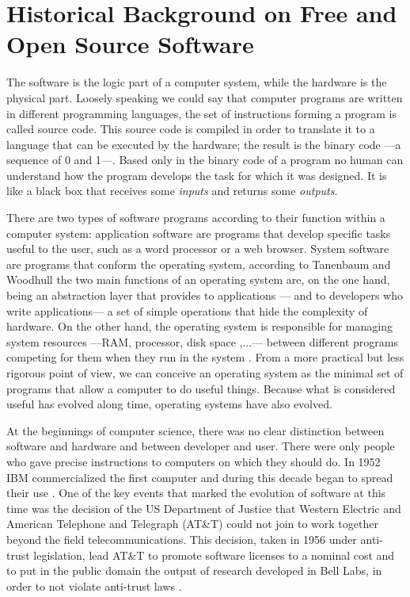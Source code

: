 \chapter{Historical Background on Free and Open Source Software}
\label{historical_outline}

The software is the logic part of a computer system, while the hardware is the physical part. Loosely speaking we could say that computer programs are written in different programming languages, the set of instructions forming a program is called source code. This source code is compiled in order to translate it to a language that can be executed by the hardware; the result is the binary code ---a sequence of 0 and 1---. Based only in the binary code of a program no human can understand how the program develops the task for which it was designed. It is like a black box that receives some \emph{inputs} and returns some \emph{outputs}.

There are two types of software programs according to their function within a computer system: application software are programs that develop specific tasks useful to the user, such as a word processor or a web browser. System software are programs that conform the operating system, according to Tanenbaum and Woodhull the two main functions of an operating system are, on the one hand, being an abstraction layer that provides to applications --- and to developers who write applications--- a set of simple operations that hide the complexity of hardware. On the other hand, the operating system is responsible for managing system resources ---RAM, processor, disk space ,...--- between different programs competing for them when they run in the system \citep[3-5]{tanenbaum:1996}. From a more practical but less rigorous point of view, we can conceive an operating system as the minimal set of programs that allow a computer to do useful things. Because what is considered useful has evolved along time, operating systems have also evolved.

At the beginnings of computer science, there was no clear distinction between software and hardware and between developer and user. There were only people who gave precise instructions to computers on which they should do. In 1952 IBM commercialized the first computer and during this decade began to spread their use \citep[21]{weber:2004}. One of the key events that marked the evolution of software at this time was the decision of the US Department of Justice that Western Electric and American Telephone and Telegraph (AT\&T) could not join to work together beyond the field telecommunications. This decision, taken in 1956 under anti-trust legislation, lead AT\&T to promote software licenses to a nominal cost and to put in the public domain the output of research developed in Bell Labs, in order to not violate anti-trust laws \citep[20]{roca:2007}.

